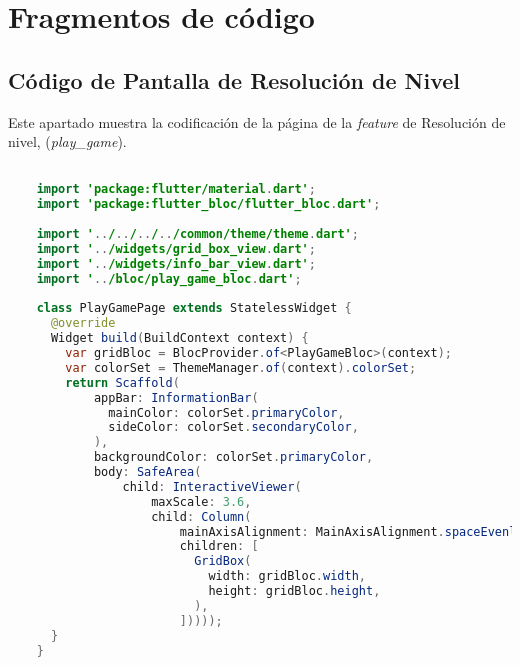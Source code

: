 \chapter{Fragmentos de código}

\section{Código de Pantalla de Resolución de Nivel}

\label{cap:anexo1-1}

Este apartado muestra la codificación de la página de la \textit{feature} de Resolución de nivel, (\textit{play\_game}).

\begin{lstlisting}[language=Java]

    import 'package:flutter/material.dart';
    import 'package:flutter_bloc/flutter_bloc.dart';
    
    import '../../../../common/theme/theme.dart';
    import '../widgets/grid_box_view.dart';
    import '../widgets/info_bar_view.dart';
    import '../bloc/play_game_bloc.dart';
    
    class PlayGamePage extends StatelessWidget {
      @override
      Widget build(BuildContext context) {
        var gridBloc = BlocProvider.of<PlayGameBloc>(context);
        var colorSet = ThemeManager.of(context).colorSet;
        return Scaffold(
            appBar: InformationBar(
              mainColor: colorSet.primaryColor,
              sideColor: colorSet.secondaryColor,
            ),
            backgroundColor: colorSet.primaryColor,
            body: SafeArea(
                child: InteractiveViewer(
                    maxScale: 3.6,
                    child: Column(
                        mainAxisAlignment: MainAxisAlignment.spaceEvenly,
                        children: [
                          GridBox(
                            width: gridBloc.width,
                            height: gridBloc.height,
                          ),
                        ]))));
      }
    }
    
    \end{lstlisting}